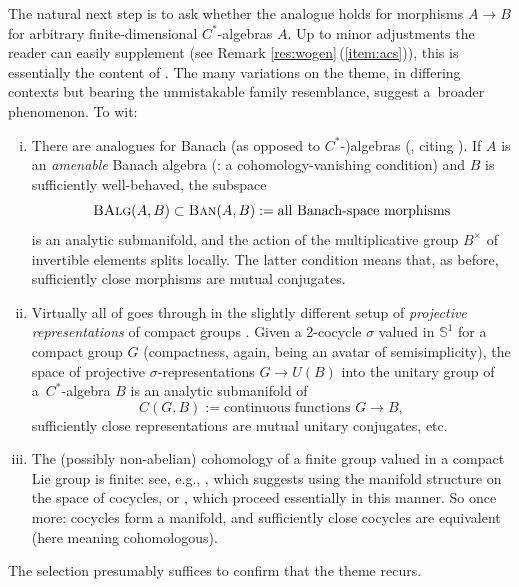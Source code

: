 \documentclass[10pt,a4paper]{amsart}
\numberwithin{equation}{section}
\newcommand\bS{{\mathbb S}}
\newcommand{\cat}[1]{\text{\sc #1}}
\begin{document}
The natural next step is to ask whether the analogue holds for morphisms $A\to B$ for arbitrary finite-dimensional $C^*$-algebras $A$. Up to minor adjustments the reader can easily supplement (see Remark \ref{res:wogen}\,(\ref{item:acs})), this is essentially the content of \cite[Proposition~2.2]{acs}. The many variations on the theme, in differing contexts but bearing the unmistakable family resemblance, suggest a~broader phenomenon. To wit:
\begin{enumerate}[(i)]\itemsep=0pt
\item\label{item:8} There are analogues for Banach (as opposed to $C^*$-)algebras (\cite[Proposition 8.2.2 and Theorem 8.2.3]{run-lec}, citing \cite[Proposition~4.1 and Theorem~4.5]{cg-amen}).
 If $A$ is an {\it amenable} Banach algebra (\cite[Definition 2.1.9]{run-lec}: a cohomology-vanishing condition) and $B$ is sufficiently well-behaved, the subspace
 \begin{equation*}
 \cat{BAlg}(A,B)\subset \cat{Ban}(A,B):=\text{all Banach-space morphisms}
 \end{equation*}
 is an analytic submanifold, and the action of the multiplicative group $B^{\times}$ of invertible elements splits locally. The latter condition means that, as before, sufficiently close morphisms are mutual conjugates.


\item\label{item:9} Virtually all of goes through in the slightly different setup of {\it projective representations} of compact groups \cite[Propositions~1.7, 2.2 and~2.3]{mart-proj}.
 Given a 2-cocycle $\sigma$ valued in $\bS^1$ for a compact group $G$ (compactness, again, being an avatar of semisimplicity), the space of projective $\sigma$-representations \cite[Section~1.4]{mart-proj} $G\to U(B)$ into the unitary group of a~$C^*$-algebra $B$ is an analytic submanifold of
 \begin{equation*}
 C(G,B):=\text{continuous functions }G\to B,
 \end{equation*}
 sufficiently close representations are mutual unitary conjugates, etc.

\item\label{item:10} The (possibly non-abelian) cohomology of a finite group valued in a compact Lie group is finite: see, e.g., \cite[Part~II, Chapter~IV, Exercise~1]{ser-lag}, which suggests using the manifold structure on the space of cocycles, or \cite[Theorems~1.1 and~1.2 and Corollary~1.1]{aw-nonab}, which proceed essentially in this manner.
 So once more: cocycles form a manifold, and sufficiently close cocycles are equivalent (here meaning cohomologous).
\end{enumerate}
The selection presumably suffices to confirm that the theme recurs.
\end{document}
